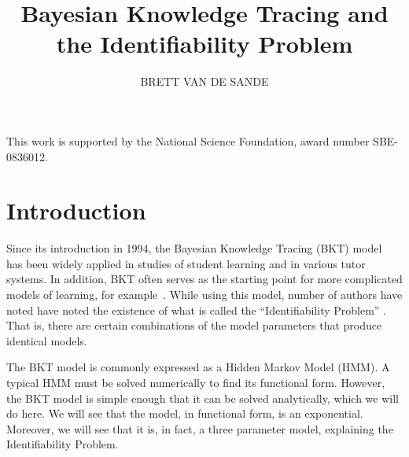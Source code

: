 \documentclass{acmlarge-edm}
\title{Bayesian Knowledge Tracing and the Identifiability Problem}
\author{BRETT VAN DE SANDE
\affil{Arizona State University\\bvds@asu.edu}}
\begin{document}


\begin{bottomstuff}
This work is supported by the National Science Foundation, award
number SBE-0836012.
\end{bottomstuff}

\maketitle

%
%


\section{Introduction}

Since its introduction in 1994, the Bayesian Knowledge Tracing (BKT) 
model~\cite{corbett_knowledge_1994} has been widely applied
in studies of student learning and in various tutor systems.  
In addition, BKT  often serves as the starting
%
%
point for more complicated models of learning, for 
example~\cite{baker_r._improving_2008,lee_impact_2012}.  
While using this model,  number of authors have noted have noted the 
existence of what is called the ``Identifiability Problem'' 
\cite{beck_identifiability:_2007}.    
That is, there are certain combinations of the model 
parameters that produce identical models.   

The BKT model is commonly expressed as a Hidden Markov Model (HMM).
A typical HMM must be solved numerically to find its functional form.
However, the BKT model is simple enough that it can be solved analytically,
which we will do here.  We will see that the model, in functional
form, is an exponential.  Moreover, we will see that it is, in fact,
a three parameter model, explaining the Identifiability Problem.

\end{document}
